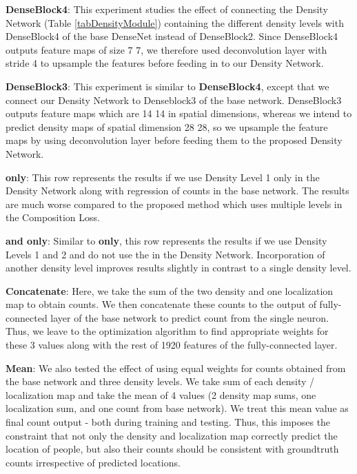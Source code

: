 \documentclass[runningheads]{llncs}
\newcommand{\cross}[1]{#1  #1}
\begin{document}
\smallskip

\noindent\textbf{DenseBlock4}: This experiment studies the effect of connecting the Density Network (Table \ref{tabDensityModule}) containing the different density levels with DenseBlock4 of the base DenseNet instead of DenseBlock2. Since DenseBlock4 outputs feature maps of size \cross{7}, we therefore used deconvolution layer with stride 4 to upsample the features before feeding in to our Density Network.

\smallskip

\noindent\textbf{DenseBlock3}: This experiment is similar to \textbf{DenseBlock4}, except that we connect our Density Network to Denseblock3 of the base network. DenseBlock3 outputs feature maps which are \cross{14} in spatial dimensions,  whereas we intend to predict density maps of spatial dimension \cross{28}, so we upsample the feature maps by using deconvolution layer before feeding them to the proposed Density Network.

\smallskip

\noindent\textbf{ only}: This row represents the results if we use Density Level 1 only in the Density Network along with regression of counts in the base network. The results are much worse compared to the proposed method which uses multiple levels in the Composition Loss.

\smallskip

\noindent\textbf{ and  only}: Similar to  \textbf{only}, this row represents the results if we use Density Levels 1 and 2 and do not use the  in the Density Network. Incorporation of another density level improves results slightly in contrast to a single density level.

\smallskip

\noindent\textbf{Concatenate}: Here, we take the sum of the two density and one localization map to obtain  counts. We then concatenate these counts to the output of fully-connected layer of the base network to predict count from the single neuron. Thus, we leave to the optimization algorithm to find appropriate weights for these 3 values along with the rest of 1920 features of the fully-connected layer.

\smallskip

\noindent\textbf{Mean}: We also tested the effect of using equal weights for counts obtained from the base network and three density levels. We take sum of each density / localization map and take the mean of 4 values (2 density map sums, one localization sum, and one count from base network). We treat this mean value as final count output - both during training and testing. Thus, this imposes the constraint that not only the density and localization map correctly predict the location of people, but also their counts should be consistent with groundtruth counts irrespective of predicted locations.
\end{document}
